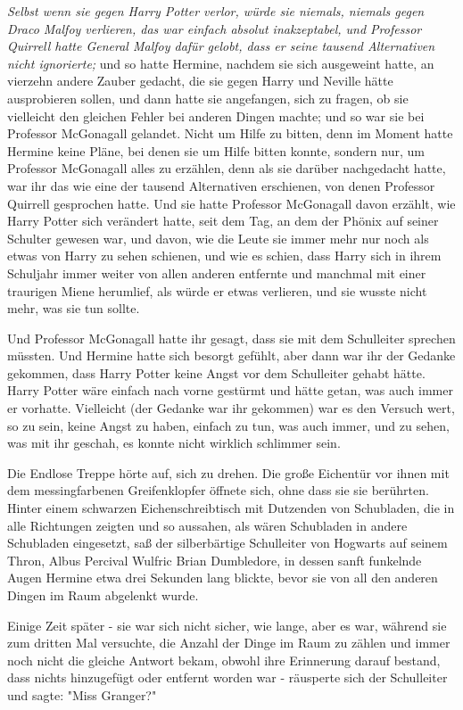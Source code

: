 {\emph{Selbst wenn sie gegen Harry Potter verlor, würde sie niemals, niemals gegen Draco Malfoy verlieren, das war einfach absolut inakzeptabel, und Professor Quirrell hatte General Malfoy dafür gelobt, dass er seine tausend Alternativen nicht ignorierte;} und so hatte Hermine, nachdem sie sich ausgeweint hatte, an vierzehn andere Zauber gedacht, die sie gegen Harry und Neville hätte ausprobieren sollen, und dann hatte sie angefangen, sich zu fragen, ob sie vielleicht den gleichen Fehler bei anderen Dingen machte; und so war sie bei Professor McGonagall gelandet. Nicht um Hilfe zu bitten, denn im Moment hatte Hermine keine Pläne, bei denen sie um Hilfe bitten konnte, sondern nur, um Professor McGonagall alles zu erzählen, denn als sie darüber nachgedacht hatte, war ihr das wie eine der tausend Alternativen erschienen, von denen Professor Quirrell gesprochen hatte. Und sie hatte Professor McGonagall davon erzählt, wie Harry Potter sich verändert hatte, seit dem Tag, an dem der Phönix auf seiner Schulter gewesen war, und davon, wie die Leute sie immer mehr nur noch als etwas von Harry zu sehen schienen, und wie es schien, dass Harry sich in ihrem Schuljahr immer weiter von allen anderen entfernte und manchmal mit einer traurigen Miene herumlief, als würde er etwas verlieren, und sie wusste nicht mehr, was sie tun sollte.

Und Professor McGonagall hatte ihr gesagt, dass sie mit dem Schulleiter sprechen müssten. Und Hermine hatte sich besorgt gefühlt, aber dann war ihr der Gedanke gekommen, dass Harry Potter keine Angst vor dem Schulleiter gehabt hätte. Harry Potter wäre einfach nach vorne gestürmt und hätte getan, was auch immer er vorhatte. Vielleicht (der Gedanke war ihr gekommen) war es den Versuch wert, so zu sein, keine Angst zu haben, einfach zu tun, was auch immer, und zu sehen, was mit ihr geschah, es konnte nicht wirklich schlimmer sein.

Die Endlose Treppe hörte auf, sich zu drehen. Die große Eichentür vor ihnen mit dem messingfarbenen Greifenklopfer öffnete sich, ohne dass sie sie berührten. Hinter einem schwarzen Eichenschreibtisch mit Dutzenden von Schubladen, die in alle Richtungen zeigten und so aussahen, als wären Schubladen in andere Schubladen eingesetzt, saß der silberbärtige Schulleiter von Hogwarts auf seinem Thron, Albus Percival Wulfric Brian Dumbledore, in dessen sanft funkelnde Augen Hermine etwa drei Sekunden lang blickte, bevor sie von all den anderen Dingen im Raum abgelenkt wurde.

Einige Zeit später - sie war sich nicht sicher, wie lange, aber es war, während sie zum dritten Mal versuchte, die Anzahl der Dinge im Raum zu zählen und immer noch nicht die gleiche Antwort bekam, obwohl ihre Erinnerung darauf bestand, dass nichts hinzugefügt oder entfernt worden war - räusperte sich der Schulleiter und sagte: "Miss Granger?"

}
